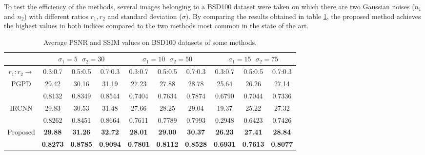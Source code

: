 To test the efficiency of the methods, several images belonging to a 
BSD100 dataset \cite{0884882842} were taken on which there are two Gaussian noises ($n_1$ 
and $n_2$) with different ratios $r_1, r_2$ and standard deviation ($\sigma$). By comparing the 
results obtained in table \ref{indexCompare}, the proposed method achieves the highest values 
in both indices compared to the two methods \cite{0884882815} \cite{0884882819} most common in the 
state of the art.
\begin{table}[h!]
    \centering
    \begin{adjustbox}{max width=\textwidth}
    \begin{tabular}{|c||ccc|ccc|ccc|}
        \hline
            & \multicolumn{3}{c||}{$\sigma_1=5 ~~~\sigma_2=30 $} & \multicolumn{3}{c||}{$\sigma_1=10 ~~~\sigma_2=50 $} & \multicolumn{3}{c||}{$\sigma_1=15 ~~~\sigma_2=75 $}\\
        \hline        
        $r_1:r_2\rightarrow$ & 0.3:0.7 & 0.5:0.5 & 0.7:0.3 & 0.3:0.7 & 0.5:0.5 & 0.7:0.3 & 0.3:0.7 & 0.5:0.5 & 0.7:0.3\\
        \hline 
        \hline
        \multirow{2}{*}{PGPD\cite{0884882815}} & 29.42 & 30.16 & 31.19 & 27.23 & 27.88 & 28.78 &25.64 & 26.26 & 27.14\\
        & 0.8132 & 0.8349 & 0.8544 & 0.7404 & 0.7634 & 0.7874 & 0.6790 & 0.7044 & 0.7336\\
        \hline
        \multirow{2}{*}{IRCNN\cite{0884882819}} & 29.83 & 30.53 & 31.48 & 27.66 & 28.25 & 29.04 & 19.37 & 25.22 & 27.32\\
        & 0.8262 & 0.8451 & 0.8664 & 0.7611 & 0.7789 & 0.7993 & 0.2948 & 0.6423 & 0.7426\\
        \hline
        \multirow{2}{*}{Proposed} & \bfseries{29.88} & \bfseries{31.26} & \bfseries{32.72} & \bfseries{28.01} & \bfseries{29.00} & \bfseries{30.37} & \bfseries{26.23} & \bfseries{27.41} & \bfseries{28.84}\\
        & \bfseries{0.8273} & \bfseries{0.8785} & \bfseries{0.9094} & \bfseries{0.7801} & \bfseries{0.8112} & \bfseries{0.8528} & \bfseries{0.6931} & \bfseries{0.7613} & \bfseries{0.8077}\\
        \hline
    \end{tabular}
    \end{adjustbox}
    \caption{Average PSNR and SSIM values on BSD100 datasets of some methods.}
    \label{indexCompare}
\end{table}

